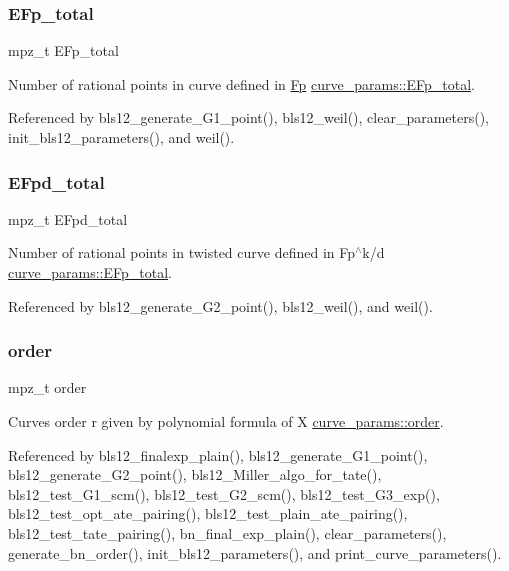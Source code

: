 \subsubsection{\texorpdfstring{E\+Fp\+\_\+total}{EFp\_total}}
{\footnotesize\ttfamily mpz\+\_\+t E\+Fp\+\_\+total}

Number of rational points in curve defined in \hyperlink{struct_fp}{Fp} \hyperlink{structcurve__params_a6bf91dafda4f4779069da69efe4a7550}{curve\+\_\+params\+::\+E\+Fp\+\_\+total}. 

Referenced by bls12\+\_\+generate\+\_\+\+G1\+\_\+point(), bls12\+\_\+weil(), clear\+\_\+parameters(), init\+\_\+bls12\+\_\+parameters(), and weil().

\mbox{\label{structcurve__params_a5a7b670d8ea5bf30cda27dc5b14096ab}} 
\subsubsection{\texorpdfstring{E\+Fpd\+\_\+total}{EFpd\_total}}
{\footnotesize\ttfamily mpz\+\_\+t E\+Fpd\+\_\+total}

Number of rational points in twisted curve defined in Fp$^\wedge$k/d \hyperlink{structcurve__params_a6bf91dafda4f4779069da69efe4a7550}{curve\+\_\+params\+::\+E\+Fp\+\_\+total}. 

Referenced by bls12\+\_\+generate\+\_\+\+G2\+\_\+point(), bls12\+\_\+weil(), and weil().

\mbox{\label{structcurve__params_aead4939b8a895eace7b64a9567e02627}} 
\subsubsection{\texorpdfstring{order}{order}}
{\footnotesize\ttfamily mpz\+\_\+t order}

Curves order r given by polynomial formula of X \hyperlink{structcurve__params_aead4939b8a895eace7b64a9567e02627}{curve\+\_\+params\+::order}. 

Referenced by bls12\+\_\+finalexp\+\_\+plain(), bls12\+\_\+generate\+\_\+\+G1\+\_\+point(), bls12\+\_\+generate\+\_\+\+G2\+\_\+point(), bls12\+\_\+\+Miller\+\_\+algo\+\_\+for\+\_\+tate(), bls12\+\_\+test\+\_\+\+G1\+\_\+scm(), bls12\+\_\+test\+\_\+\+G2\+\_\+scm(), bls12\+\_\+test\+\_\+\+G3\+\_\+exp(), bls12\+\_\+test\+\_\+opt\+\_\+ate\+\_\+pairing(), bls12\+\_\+test\+\_\+plain\+\_\+ate\+\_\+pairing(), bls12\+\_\+test\+\_\+tate\+\_\+pairing(), bn\+\_\+final\+\_\+exp\+\_\+plain(), clear\+\_\+parameters(), generate\+\_\+bn\+\_\+order(), init\+\_\+bls12\+\_\+parameters(), and print\+\_\+curve\+\_\+parameters().

